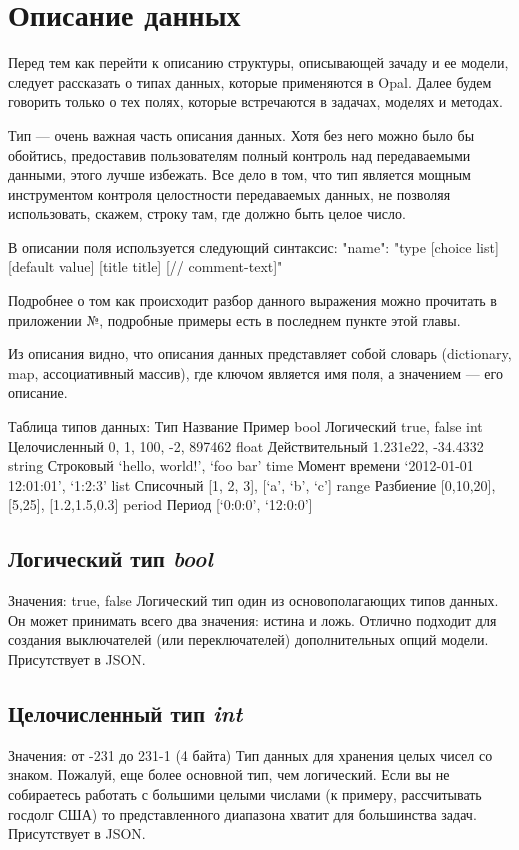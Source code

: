 \section{Описание данных}

Перед тем как перейти к описанию структуры, описывающей зачаду и ее модели, следует рассказать о типах данных, которые применяются в Opal. Далее будем говорить только о тех полях, которые встречаются в задачах, моделях и методах.

Тип --- очень важная часть описания данных. Хотя без него можно было бы обойтись, предоставив пользователям полный контроль над передаваемыми данными, этого лучше избежать. Все дело в том, что тип является мощным инструментом контроля целостности передаваемых данных, не позволяя использовать, скажем, строку там, где должно быть целое число.

В описании поля используется следующий синтаксис:
        "name": "type [choice list] [default value] [title title]
[// comment-text]"

Подробнее о том как происходит разбор данного выражения можно прочитать в приложении №, подробные примеры есть в последнем пункте этой главы.

Из описания видно, что описания данных представляет собой словарь (dictionary, map, ассоциативный массив), где ключом является имя поля, а значением — его описание.

Таблица типов данных:
Тип
	Название
	Пример
	bool
	Логический
	true, false
	int
	Целочисленный
	0, 1, 100, -2, 897462
	float
	Действительный
	1.231e22, -34.4332
	string
	Строковый
	‘hello, world!’, ‘foo bar’
	time
	Момент времени
	‘2012-01-01 12:01:01’, ‘1:2:3’
	list
	Списочный
	[1, 2, 3], [‘a’, ‘b’, ‘c’]
	range
	Разбиение
	[0,10,20], [5,25], [1.2,1.5,0.3]
	period
	Период
	[‘0:0:0’, ‘12:0:0’]
	
\subsection{Логический тип \emph{bool}}
Значения: true, false
Логический тип один из основополагающих типов данных. Он может принимать всего два значения: истина и ложь. Отлично подходит для создания выключателей (или переключателей) дополнительных опций модели.
Присутствует в JSON.

\subsection{Целочисленный тип \emph{int}}
Значения: от -231 до 231-1 (4 байта)
Тип данных для хранения целых чисел со знаком. Пожалуй, еще более основной тип, чем логический. Если вы не собираетесь работать с большими целыми числами (к примеру, рассчитывать госдолг США) то представленного диапазона хватит для большинства задач.
Присутствует в JSON.

